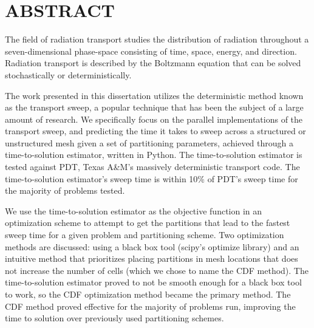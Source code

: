 %
%
%
%

\chapter*{ABSTRACT}

\pagestyle{plain} %
\setcounter{page}{2}

\indent The field of radiation transport studies the distribution of radiation throughout a seven-dimensional phase-space consisting of time, space, energy, and direction. Radiation transport is described by the Boltzmann equation that can be solved stochastically or deterministically.

The work presented in this dissertation utilizes the deterministic method known as the transport sweep, a popular technique that has been the subject of a large amount of research.
We specifically focus on the parallel implementations of the transport sweep, and predicting the time it takes to sweep across a structured or unstructured mesh given a set of partitioning parameters, achieved through a time-to-solution estimator, written in Python.
The time-to-solution estimator is tested against PDT, Texas A\&M's massively deterministic transport code.
The time-to-solution estimator's sweep time is within 10\% of PDT's sweep time for the majority of problems tested.

We use the time-to-solution estimator as the objective function in an optimization scheme to attempt to get the partitions that lead to the fastest sweep time for a given problem and partitioning scheme.
Two optimization methods are discussed: using a black box tool (scipy's optimize library) and an intuitive method that prioritizes placing partitions in mesh locations that does not increase the number of cells (which we chose to name the CDF method).
The time-to-solution estimator proved to not be smooth enough for a black box tool to work, so the CDF optimization method became the primary method.
The CDF method proved effective for the majority of problems run, improving the time to solution over previously used partitioning schemes.
\pagebreak{}
